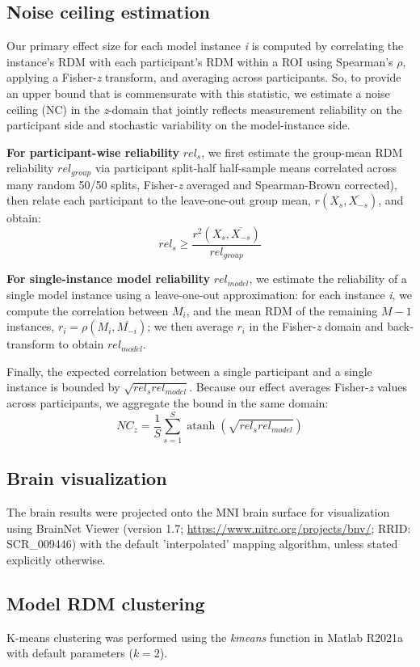 \documentclass[pdflatex,sn-mathphys-num,lineno]{sn-jnl}%
\DeclareMathOperator{\atanh}{atanh}
\begin{document}
\begin{CJK}{UTF8}{gbsn}
\subsection{Noise ceiling estimation}
Our primary effect size for each model instance \textit{i} is computed by correlating the instance’s RDM with each participant’s RDM within a ROI using Spearman’s $\rho$, applying a Fisher-\textit{z} transform, and averaging across participants. So, to provide an upper bound that is commensurate with this statistic, we estimate a noise ceiling (NC) in the \textit{z}-domain that jointly reflects measurement reliability on the participant side and stochastic variability on the model-instance side.

\textbf{For participant-wise reliability} $rel_s$, we first estimate the group-mean RDM reliability $rel_{group}$ via participant split-half half-sample means correlated across many random 50/50 splits, Fisher-\textit{z} averaged and Spearman-Brown corrected), then relate each participant to the leave-one-out group mean, $r(X_s, \overline{X_{-s}})$, and obtain:
\[
rel_s \ge \frac{r^2(X_s, \overline{X_{-s}})}{rel_{group}}
\]

\textbf{For single-instance model reliability} $rel_{model}$, we estimate the reliability of a single model instance using a leave-one-out approximation: for each instance \textit{i}, we compute the correlation between $M_i$, and the mean RDM of the remaining $M-1$ instances, $r_i = \rho(M_i, \overline{M_{-i}})$; we then average $r_i$ in the Fisher-\textit{z} domain and back-transform to obtain $rel_{model}$.

Finally, the expected correlation between a single participant and a single instance is bounded by $\sqrt{rel_{s}rel_{model}}$. Because our effect averages Fisher-\textit{z} values across participants, we aggregate the bound in the same domain:
\[
NC_z = \frac{1}{S}\sum_{s=1}^{S}\atanh(\sqrt{rel_{s}rel_{model}})
\]

\subsection{Brain visualization}
The brain results were projected onto the MNI brain surface for visualization using BrainNet Viewer \cite{xia_brainnet_2013} (version 1.7; \url{https://www.nitrc.org/projects/bnv/}; RRID: SCR\_009446) with the default 'interpolated' mapping algorithm, unless stated explicitly otherwise.

\subsection{Model RDM clustering}
K-means clustering was performed using the \textit{kmeans} function in Matlab R2021a with default parameters ($k = 2$).


\end{CJK}
\end{document}
